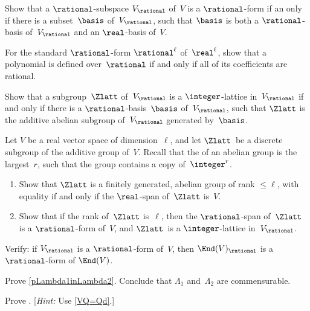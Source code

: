 \begin{exercises}

\item \label{Qform<>basis}
 Show that a $\rational$-subspace $V_{\rational}$ of~$V$ is
a $\rational$-form if an only if there is a subset~$\basis$
of~$V_{\rational}$, such that $\basis$ is both a
$\rational$-basis of~$V_{\rational}$ and an $\real$-basis
of~$V$.

\item \label{Qdefd<>Qcoeffs}
 For the standard $\rational$-form $\rational^\ell$
of~$\real^\ell$, show that a polynomial is defined
over~$\rational$ if and only if all of its coefficients are
rational.

\item \label{vsLatt<>basis}
 Show that a subgroup~$\Zlatt$ of~$V_{\rational}$ is a
$\integer$-lattice in~$V_{\rational}$ if and only if there
is a $\rational$-basis~$\basis$ of~$V_{\rational}$, such
that $\Zlatt$ is the additive abelian subgroup
of~$V_{\rational}$ generated by~$\basis$.

\item \label{VSLatt<>Rank}
 Let $V$ be a real vector space of dimension~$\ell$,
and let $\Zlatt$~be a discrete subgroup of the additive
group of~$V$. Recall that the  of an abelian group is the largest~$r$, such that the group contains a copy of~$\integer^r$.
 \begin{enumerate}
 \item Show that $\Zlatt$ is a finitely generated, abelian
group of rank $\le \ell$, with equality if and only if the
$\real$-span of~$\Zlatt$ is~$V$.
 \item Show that if the rank of~$\Zlatt$ is~$\ell$, then
the $\rational$-span of~$\Zlatt$ is a $\rational$-form
of~$V$, and $\Zlatt$~is a $\integer$-lattice
in~$V_{\rational}$.
 \end{enumerate}

\item \label{VQ->End(V)Q}
 Verify: if $V_{\rational}$ is a $\rational$-form
of~$V$, then $\End(V)_{\rational}$ is a
$\rational$-form of $\End(V)$.

\item \label{VQ->vslatt}
 Prove \cref{pLambda1inLambda2}. Conclude that
$\Lambda_1$ and~$\Lambda_2$ are commensurable.

\item \label{VQ->LattInG}
 Prove . [{\it Hint:}
Use \cref{VQ=Qd}.]


\end{exercises}
